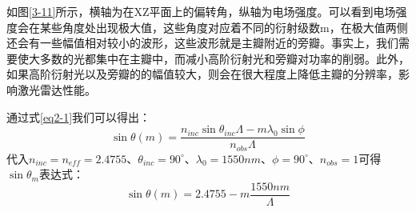 \documentclass[UTF8,a4paper,12pt]{ctexart}
\numberwithin{equation}{section}
\begin{document}
 如图\ref{3-11}所示，横轴为在XZ平面上的偏转角，纵轴为电场强度。可以看到电场强度会在某些角度处出现极大值，这些角度对应着不同的衍射级数m，在极大值两侧还会有一些幅值相对较小的波形，这些波形就是主瓣附近的旁瓣。事实上，我们需要使大多数的光都集中在主瓣中，而减小高阶衍射光和旁瓣对功率的削弱。此外，如果高阶衍射光以及旁瓣的的幅值较大，则会在很大程度上降低主瓣的分辨率，影响激光雷达性能。

通过式\ref{eq2-1}我们可以得出：
\begin{equation}
    \sin{\theta(m)}=\frac{n_{inc}\sin{\theta_{inc}}\Lambda-m\lambda_0\sin{\phi}}{n_{obs}\Lambda}
    \label{eq3-4}
\end{equation}
代入$n_{inc}=n_{eff}=2.4755$、$\theta_{inc}=90^\circ$、$\lambda_0=1550nm$、$\phi=90^\circ$、$n_{obs}=1$可得$\sin{\theta_m}$表达式：
\begin{equation}
   \sin{\theta(m)}=2.4755-m\frac{1550nm}{\Lambda}
   \label{eq3-5}
\end{equation}
\end{document}
